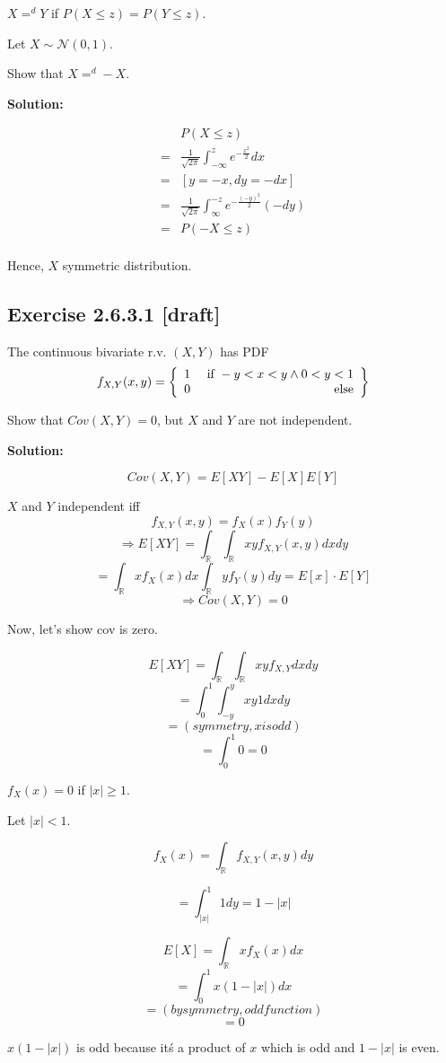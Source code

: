 \documentclass{article}
\begin{document}
\(X=^dY\) if \(P(X\leq z)=P(Y\leq z)\).

Let \(X \sim \mathcal{N}(0, 1)\).

Show that \(X=^d-X\).

\textbf{Solution:}

\begin{align*}
	 & P(X\leq z) \\
	=& \frac{1}{\sqrt{2\pi}} \int_{-\infty}^z e^{-\frac{x^2}{2}}dx \\
	=& [y=-x, dy=-dx] \\
	=& \frac{1}{\sqrt{2\pi}} \int_{\infty}^{-z} e^{-\frac{(-y)^2}{2}}(-dy) \\
	=& P(-X\leq z) \\
\end{align*}

Hence, \(X\) symmetric distribution.

\subsection{Exercise 2.6.3.1 [draft]}

The continuous bivariate r.v. \((X,Y)\) has PDF
\[f_{X,Y}(x,y)=\left\{\begin{array}{lr}1 & \text{ if }-y<x<y \wedge 0<y<1\\0 & \text{ else}\end{array}\right\}\]

Show that \(Cov(X,Y)=0\), but \(X\) and \(Y\) are not independent.

\textbf{Solution:}

\[Cov(X,Y) = E[XY]-E[X]E[Y]\]

\(X\) and \(Y\) independent iff
\[f_{X,Y}(x,y)=f_X(x)f_Y(y)\]
\[\Rightarrow E[XY]=\int_\mathbb{R}\int_\mathbb{R} xy f_{X,Y}(x,y)dxdy\]
\[= \int_\mathbb{R}xf_X(x)dx \int_\mathbb{R} yf_Y(y)dy = E[x]\cdot E[Y]\]
\[\Rightarrow Cov(X,Y)=0\]

Now, let's show cov is zero.

\[E[XY]=\int_\mathbb{R} \int_\mathbb{R} xy f_{X,Y}dxdy\]
\[=\int_0^1\int_{-y}^y xy1dxdy\]
\[=(symmetry, x is odd)\]
\[=\int_0^1 0=0\]

\(f_X(x)=0\) if \(|x|\geq 1\).

Let \(|x|<1\).

\[f_X(x)=\int_\mathbb{R} f_{X,Y}(x,y)dy\]

\[=\int_{|x|}^1 1dy = 1-|x|\]

\[E[X] = \int_\mathbb{R} x f_X(x)dx\]
\[= \int_0^1 x (1-|x|)dx\]
\[= (by symmetry, odd function)\]
\[= 0\]

\(x(1-|x|)\) is odd because it\'s a product of \(x\) which is odd and \(1-|x|\) is even.
\end{document}
